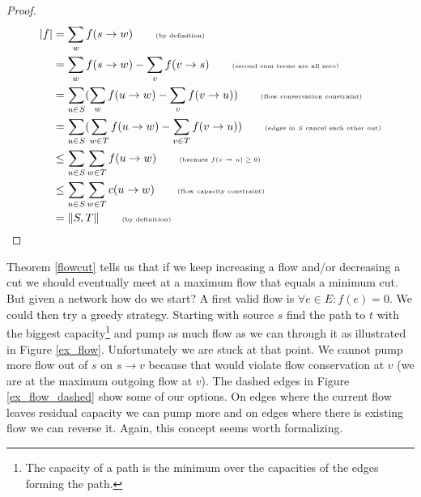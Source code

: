 \begin{proof}

\begin{align*}
|f| &= \sum_w f(s \rightarrow w) \tag*{\tiny{(by definition)}}\\
    &= \sum_w f(s \rightarrow w) - \sum_v f(v \rightarrow s) \tag*{\tiny{(second sum terms are all zero)}}\\
    &= \sum_{u \in S} (\sum_w f(u \rightarrow w) - \sum_v f(v \rightarrow u)) \tag*{\tiny{(flow conservation constraint)}}\\
    &= \sum_{u \in S} (\sum_{w \in T} f(u \rightarrow w) - \sum_{v \in T} f(v \rightarrow u)) \tag*{\tiny{(edges in $S$ cancel each other out)}}\\
    &\leq \sum_{u \in S} \sum_{w \in T} f(u \rightarrow w) \tag*{\tiny{(because $f(v \rightarrow u) \geq 0$)}}\\
    &\leq \sum_{u \in S} \sum_{w \in T} c(u \rightarrow w) \tag*{\tiny{(flow capacity constraint)}}\\
    &= \|S, T\| \tag*{\tiny{(by definition)}}
\end{align*}

\end{proof}

Theorem \ref{flowcut} tells us that if we keep increasing a flow and/or decreasing a cut we should eventually meet at a maximum flow that equals a minimum cut. But given a network how do we start? A first valid flow is $\forall e \in E: f(e) = 0$. We could then try a greedy strategy. Starting with source $s$ find the path to $t$ with the biggest capacity\footnote{The capacity of a path is the minimum over the capacities of the edges forming the path.} and pump as much flow as we can through it as illustrated in Figure \ref{ex_flow}. Unfortunately we are stuck at that point. We cannot pump more flow out of $s$ on $s \rightarrow v$ because that would violate flow conservation at $v$ (we are at the maximum outgoing flow at $v$). The dashed edges in Figure \ref{ex_flow_dashed} show some of our options. On edges where the current flow leaves residual capacity we can pump more and on edges where there is existing flow we can reverse it. Again, this concept seems worth formalizing.

